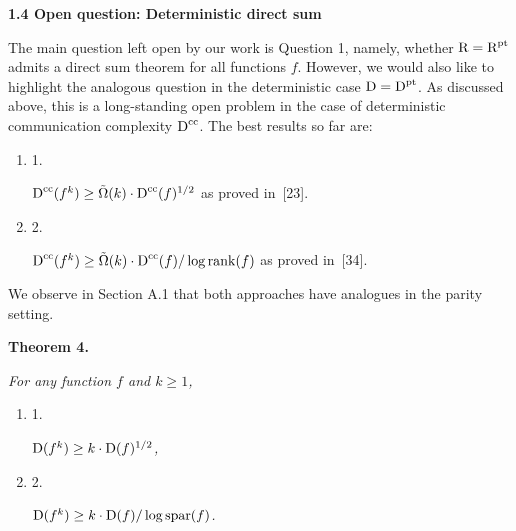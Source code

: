 \documentclass[10pt,a4paper]{article}
\begin{document}
\par\medskip\noindent\textbf{
1.4 Open question: Deterministic direct sum}\par




The main question left open by our work is Question 1, namely, whether ${\textup{R}}={\textup{R}}^{\textup{pt}}$ admits a direct sum theorem for all functions $f$. However, we would also like to highlight the analogous question in the deterministic case ${\textup{D}}={\textup{D}}^{\textup{pt}}$. As discussed above, this is a long-standing open problem in the case of deterministic communication complexity ${\textup{D}}^{\textup{cc}}$. The best results so far are:\par


\begin{enumerate}


\item[] 
1. 


${\textup{D}}^{\textup{cc}}(f^{k})\geq\tilde{\Omega}(k)\cdot{\textup{D}}^{\textup{cc}}(f)^{1/2}$ as proved in [23].\par





\item[] 
2. 


${\textup{D}}^{\textup{cc}}(f^{k})\geq\tilde{\Omega}(k)\cdot{\textup{D}}^{\textup{cc}}(f)/\log\mathrm{rank}(f)$ as proved in [34].\par





\end{enumerate}


We observe in Section A.1 that both approaches have analogues in the parity setting.\par





\par\medskip\noindent\textbf{
\textbf{Theorem 4}\textbf{.}
}\par



\emph{For any function $f$ and $k\geq 1$,}\par


\begin{enumerate}


\item[] 
1. 


${\textup{D}}(f^{k})\geq k\cdot{\textup{D}}(f)^{1/2}$\emph{,}\par





\item[] 
2. 


${\textup{D}}(f^{k})\geq k\cdot{\textup{D}}(f)/\log\mathrm{spar}(f)$\emph{.}\par





\end{enumerate}
\end{document}
